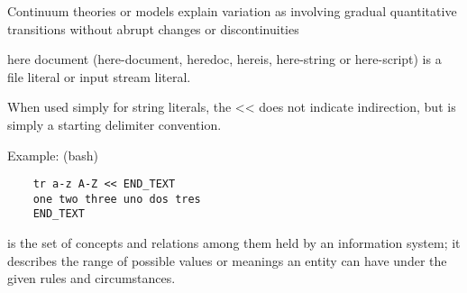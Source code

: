 \begin{definition}[Continuum]
    Continuum theories or models explain variation as involving gradual
    quantitative transitions without abrupt changes or discontinuities

\end{definition}

\begin{definition}
    here document (here-document, heredoc, hereis, here-string or here-script) is
    a file literal or input stream literal.

    When used simply for string literals, the << does not indicate indirection,
    but is simply a starting delimiter convention. 

    Example: (bash) 
\begin{verbatim}
    tr a-z A-Z << END_TEXT 
    one two three uno dos tres
    END_TEXT
\end{verbatim}

\end{definition}

\begin{definition}
    is the set of concepts and relations among them held by an information
    system; it describes the range of possible values or meanings an entity can
    have under the given rules and circumstances.

\end{definition}
